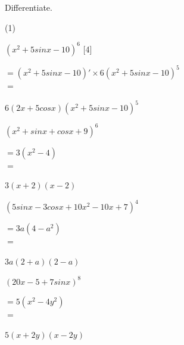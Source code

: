 \noindent Differentiate.\\
\begin{tasks}(1)
    \task \begin{exercise}$(x^2+5sinx-10)^6$ \hfill [4]
              \begin{envSolution}
                 $ = (x^2+5sinx-10)' \times 6(x^2+5sinx-10)^{5}  $\\ 
                 $ =$			 
                     \begin{shortsolution}
  	                    $ 6(2x+5cosx)(x^2+5sinx-10)^{5}$
                     \end{shortsolution}
              \end{envSolution}%
          \end{exercise}
 
    \task \begin{exercise}$(x^2+sinx+cosx+9)^6$
              \begin{envSolution}
                 $ =3(x^2-4)   $\\ 
                 $ =$			 
                     \begin{shortsolution}
  	                    $ 3(x+2)(x-2)$
                     \end{shortsolution}
              \end{envSolution}%
          \end{exercise}
 
    \task \begin{exercise}$(5sinx-3cosx+10x^2-10x+7)^4$
              \begin{envSolution}
                 $ =3a(4-a^2)   $\\ 
                 $ =$			 
                     \begin{shortsolution}
  	                    $ 3a(2+a)(2-a)$
                     \end{shortsolution}
              \end{envSolution}%
          \end{exercise}

    \task \begin{exercise}$(20x-5+7sinx)^8$
              \begin{envSolution}
                 $ =5(x^2-4y^2)   $\\
                 $ =$			 
                     \begin{shortsolution}
  	                    $ 5(x+2y)(x-2y)$
                     \end{shortsolution}
              \end{envSolution}%
          \end{exercise}
 
\end{tasks}






